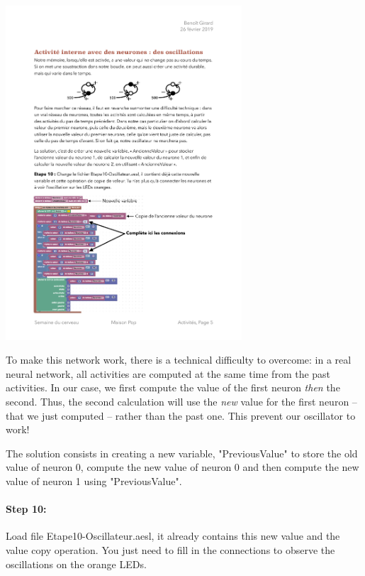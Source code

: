 \documentclass[12pt]{article}
\newcommand{\secondfile}{Etape10-Oscillateur.aesl}
\begin{document}
\begin{center}
\includegraphics[width=0.66\textwidth]{../Oscillations.pdf}
\end{center}


To make this network work, there is a technical difficulty to overcome: in a real neural network, all activities are computed at the same time from the past activities. In our case, we first compute the value of the first neuron \emph{then} the second. Thus, the second calculation will use the \emph{new} value for the first neuron -- that we just computed -- rather than the past one. This prevent our oscillator to work!

The solution consists in creating a new variable, "PreviousValue" to store the old value of neuron 0, compute the new value of neuron 0 and then compute the new value of neuron 1 using "PreviousValue".

\paragraph{Step 10:} Load file \secondfile, it already contains this new value and the value copy operation. You just need to fill in the connections to observe the oscillations on the orange LEDs.
\end{document}
